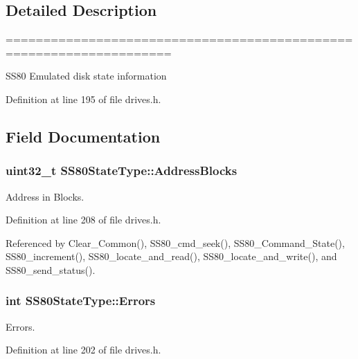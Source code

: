 \subsection{Detailed Description}
==================================================================== 

S\+S80 Emulated disk state information 

Definition at line 195 of file drives.\+h.



\subsection{Field Documentation}
\subsubsection[{\texorpdfstring{Address\+Blocks}{AddressBlocks}}]{\setlength{\rightskip}{0pt plus 5cm}uint32\+\_\+t S\+S80\+State\+Type\+::\+Address\+Blocks}\hypertarget{structSS80StateType_a6cffa1e36a57bce4188ede4bd9dbd7ad}{}\label{structSS80StateType_a6cffa1e36a57bce4188ede4bd9dbd7ad}


Address in Blocks. 



Definition at line 208 of file drives.\+h.



Referenced by Clear\+\_\+\+Common(), S\+S80\+\_\+cmd\+\_\+seek(), S\+S80\+\_\+\+Command\+\_\+\+State(), S\+S80\+\_\+increment(), S\+S80\+\_\+locate\+\_\+and\+\_\+read(), S\+S80\+\_\+locate\+\_\+and\+\_\+write(), and S\+S80\+\_\+send\+\_\+status().

\subsubsection[{\texorpdfstring{Errors}{Errors}}]{\setlength{\rightskip}{0pt plus 5cm}int S\+S80\+State\+Type\+::\+Errors}\hypertarget{structSS80StateType_a7a5c363c6f617ee457a4daacadb3a7b2}{}\label{structSS80StateType_a7a5c363c6f617ee457a4daacadb3a7b2}


Errors. 



Definition at line 202 of file drives.\+h.



